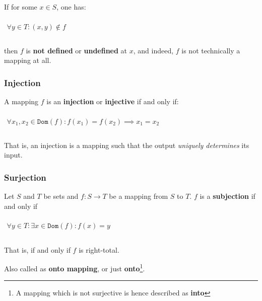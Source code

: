 If for some $x \in S$, one has:

\begin{math}
  \begin{array}{c}
    \\
    \forall y \in T: (x, y) \notin f\\
    \\
  \end{array}
\end{math}

then $f$ is \textbf{not defined} or \textbf{undefined} at $x$, and
indeed, $f$ is not technically a mapping at all.


\subsubsection{Injection}
\label{sec:injection}

A mapping $f$ is an \textbf{injection} or \textbf{injective} if and
only if:

\begin{math}
  \begin{array}{c}
    \\
    \forall x_1, x_2 \in \mathtt{Dom}(f): f(x_1) = f(x_2) \implies x_1 = x_2 \\
    \\
  \end{array}
\end{math}

That is, an injection is a mapping such that the output
\textit{uniquely determines} its input.

\subsubsection{Surjection}
\label{sec:surjection}

Let $S$ and $T$ be sets and $f : S \to T$ be a mapping from $S$ to
$T$. $f$ is a \textbf{subjection} if and only if

\begin{math}
  \begin{array}{c}
    \\
    \forall y \in T: \exists x \in \mathtt{Dom}(f) : f(x) = y\\
    \\
  \end{array}
\end{math}

That is, if and only if $f$ is right-total.

Also called as \textbf{onto mapping}, or just \textbf{onto}\footnote{A
  mapping which is not surjective is hence described as \textbf{into}}.


